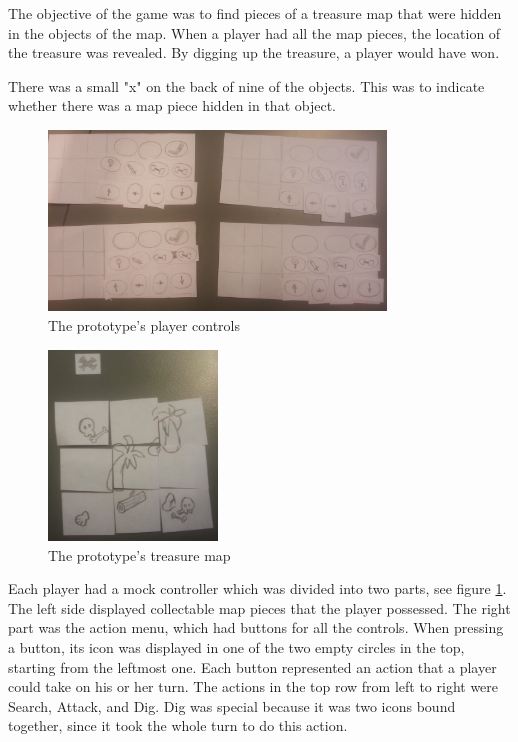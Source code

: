 The objective of the game was to find pieces of a treasure map that were hidden in the objects of the map. When a player had all the map pieces, the location of the treasure was revealed. By digging up the treasure, a player would have won.


There was a small "x" on the back of nine of the objects. This was to indicate whether there was a map piece hidden in that object.

\begin{figure}[h]
\centering
\includegraphics[width=0.8\textwidth]{figures/PPtestControls}  
\caption{The prototype's player controls}\label{fig:PPtest2}
\end{figure}

\begin{figure}
\begin{center}
\includegraphics[width=0.4\textwidth]{figures/PPtestMap} 
\end{center}
\caption{The prototype's treasure map}\label{fig:PPtest3}
\end{figure}

Each player had a mock controller which was divided into two parts, see figure \ref{fig:PPtest2}. The left side displayed collectable map pieces that the player possessed. The right part was the action menu, which had buttons for all the controls. When pressing a button, its icon was displayed in one of the two empty circles in the top, starting from the leftmost one. Each button represented an action that a player could take on his or her turn. The actions in the top row from left to right were Search, Attack, and Dig. Dig was special because it was two icons bound together, since it took the whole turn to do this action.

